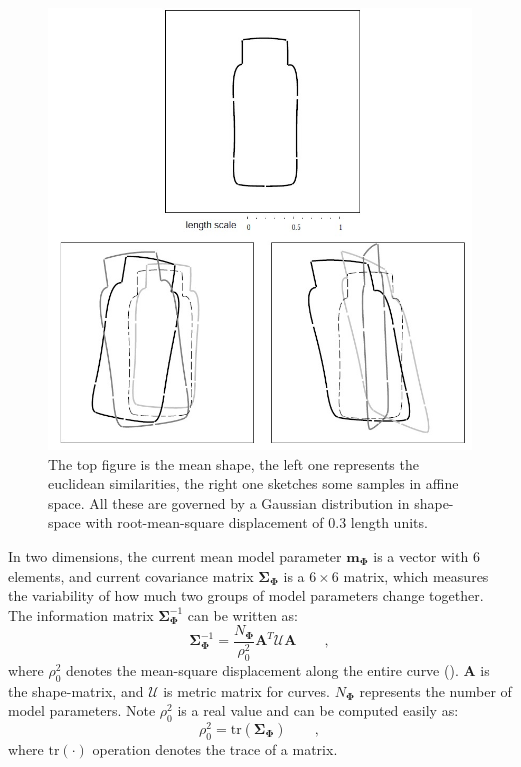\documentclass[conference]{IEEEtran}
\begin{document}
\begin{figure}[htb]
  \centering
  \includegraphics[width=\columnwidth]{images/prior.jpg}
\caption{The top
  figure is the mean shape, the left one represents the euclidean
  similarities, the right one
  sketches some samples in affine space. All these are governed by a
  Gaussian distribution in shape-space with root-mean-square
  displacement of 0.3 length units.}
\label{fig:transform}
\end{figure}

In two dimensions, the current mean model parameter
$\mathbf{m}_{\mathbf{\Phi}}$ is a vector with $6$ elements, and current
covariance matrix $\mathbf{\Sigma}_{\mathbf{\Phi}}$ is a $6 \times 6$ matrix, which measures the variability of
how much two groups of model parameters change together. The
information matrix $\mathbf{\Sigma}_{\mathbf{\Phi}}^{-1}$ can be
written as:
\begin{equation}
  \label{eq:infomatrix}
  \mathbf{\Sigma}_{\mathbf{\Phi}}^{-1} = \frac{N_{\mathbf{\Phi}}}{\rho_0^2} \mathbf{A}^T\mathcal{U}\mathbf{A}\qquad,
\end{equation}
where $\rho_0^2$ denotes the mean-square displacement along the entire
curve (\cite{blake1998active}). $\mathbf{A}$ is the shape-matrix, and $\mathcal{U}$ is
metric matrix for curves. $N_{\mathbf{\Phi}}$ represents
the number of model parameters. Note $\rho_0^2$
is a real value and can be computed easily as:
\begin{equation}
  \label{eq:trace}
  \rho_0^2 = \mathrm{tr}(\mathbf{\Sigma}_{\mathbf{\Phi}})\qquad,
\end{equation}
where $\mathrm{tr}(\cdot)$ operation denotes the trace of a matrix.
\end{document}
